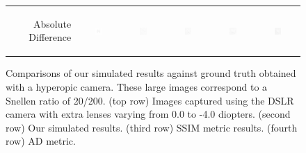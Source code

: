 \begin{figure}[!th]
\begin{tabular}{@{}r@{ } c@{ } c@{ } c@{ } c@{ } c }
	\begin{sideways} \parbox[b]{20mm} {Absolute Difference} \end{sideways} &
	\includegraphics[width=0.185\textwidth]{../../__Images/05/WB_N(20-200)_-0D_to_-4D/wb_N_20-200_Camera-0,00D(diff).png} &
	\includegraphics[width=0.185\textwidth]{../../__Images/05/WB_N(20-200)_-0D_to_-4D/wb_N_20-200_Camera-1,00D(diff).png} &
	\includegraphics[width=0.185\textwidth]{../../__Images/05/WB_N(20-200)_-0D_to_-4D/wb_N_20-200_Camera-2,00D(diff).png} &
	\includegraphics[width=0.185\textwidth]{../../__Images/05/WB_N(20-200)_-0D_to_-4D/wb_N_20-200_Camera-3,00D(diff).png} &
	\includegraphics[width=0.185\textwidth]{../../__Images/05/WB_N(20-200)_-0D_to_-4D/wb_N_20-200_Camera-4,00D(diff).png} \\
 
	\end{tabular}
	
	\caption{Comparisons of our simulated results against ground truth obtained with a hyperopic camera. These large images correspond to a Snellen ratio of 20/200. (top row) Images captured using the DSLR camera with extra lenses varying from 0.0 to -4.0 diopters. (second row) Our simulated results. (third row) SSIM metric results. (fourth row) AD metric.}
	\label{fig:comparison_hyperopic_wb}
\end{figure}